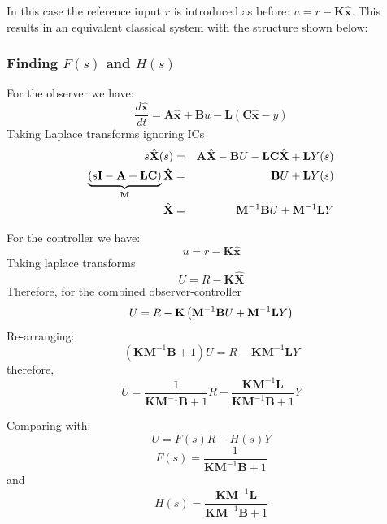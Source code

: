In this case the reference input $r$ is introduced as before: $u=r-\mathbf{K}\hat{\mathbf{x}}$.  This results in 
an equivalent classical system with the structure shown below:
\begin{center}
\end{center}


\subsubsection*{Finding $F(s)$ and $H(s)$} %
\label{ssub:finding_f_s_and_h_s_}

For the observer we have:
\[
\frac{d\hat{\mathbf{x}}}{dt} = \mathbf{A}\hat{\mathbf{x}}+\mathbf{B}u-\mathbf{L}(\mathbf{C}\hat{\mathbf{x}} - y)
\]
Taking Laplace transforms ignoring ICs
\begin{eqnarray*}
s\hat{\mathbf{X}}(s) & = & \mathbf{A}\hat{\mathbf{X}} - \mathbf{B}U - \mathbf{LC}\hat{\mathbf{X}} + \mathbf{L}Y(s) \\	
\underbrace {(s{\bf{I}} - {\bf{A}} + {\bf{LC}})}_{{\bf{M}}}{\bf{\hat X}} & = & {\bf B}U + {\bf{L}}Y(s) \\
\hat{\mathbf{X}} & = & \mathbf{M}^{-1}\mathbf{B}U + \mathbf{M}^{-1}{\bf{L}}Y
\end{eqnarray*}

For the controller we have:
\[
u = r - \mathbf{K}\hat{\mathbf{x}}
\]
Taking laplace transforms
\[
U = R - \mathbf{K}\hat{\mathbf{X}}
\]
Therefore, for the combined observer-controller
\[
U=R-\mathbf{K}\left(\mathbf{M}^{-1}\mathbf{B}U + \mathbf{M}^{-1}{\bf{L}}Y\right)
\]
Re-arranging:
\[
\left(\mathbf{KM}^{-1}\mathbf{B}+1\right)U=R-\mathbf{KM}^{-1}\mathbf{L}Y
\]
therefore,
\[
U=\frac{1}{\mathbf{KM}^{-1}\mathbf{B}+1}R-\frac{\mathbf{KM}^{-1}\mathbf{L}}{\mathbf{KM}^{-1}\mathbf{B}+1}Y
\]

Comparing with: $$U=F(s)R-H(s)Y$$
\[
F(s) = \frac{1}{\mathbf{KM}^{-1}\mathbf{B}+1}
\]
and
\[
H(s) = \frac{\mathbf{KM}^{-1}\mathbf{L}}{\mathbf{KM}^{-1}\mathbf{B}+1}
\]


